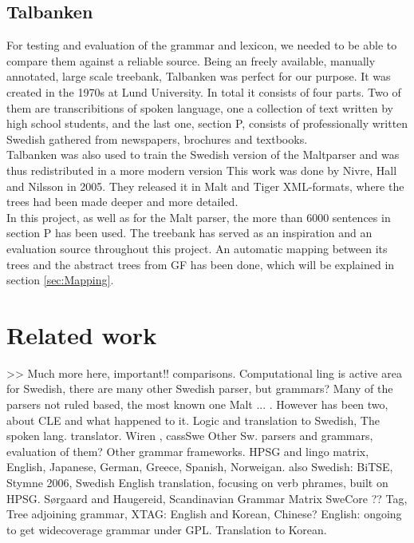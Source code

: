 \documentclass{report}
\begin{document}
\subsection{Talbanken}
For testing and evaluation of the grammar and lexicon, we needed to be able to
compare them against a reliable source.
Being an freely available, manually annotated, large scale treebank,
Talbanken\cite{talbanken} was perfect for our purpose.
It was created in the 1970s at Lund University. In total it consists of four
parts. Two of them are transcribitions of spoken language, one a collection of
text written by high school students, and the last one, section P,
consists of professionally written Swedish gathered from newspapers, brochures and textbooks.\\
Talbanken was also used to train the Swedish version of the Maltparser\cite{malt}
and was thus redistributed in a more modern version\cite{talbanken05} This work
was done by Nivre, Hall and Nilsson in 2005. They released it in Malt and Tiger XML-formats,
where the trees had been made deeper and more detailed. \\
In this project, as well as for the Malt parser, the more than 6000 sentences
in section P has been used.
The treebank has served as an inspiration and an evaluation source throughout this
project. An automatic mapping between its trees and the abstract trees from GF has been
done, which will be explained in section \ref{sec:Mapping}.

\section{Related work}
>> Much more here, important!! comparisons.
Computational ling is active area for Swedish, there are many other Swedish parser,
but grammars?
Many of the parsers not ruled based, the most known one Malt\cite{malt} ... .
However has been two, about CLE\cite{cle} and what happened to it. Logic and translation
to Swedish, The spoken lang. translator\cite{cle2}. Wiren \cite{wiren}, cassSwe \cite{casswe}
Other Sw. parsers and grammars, evaluation of them? 
Other grammar frameworks.
HPSG\cite{hpsg} and lingo matrix\cite{lingomatrix}, English, Japanese, German, Greece, Spanish, Norweigan.
also Swedish: BiTSE\cite{stymne}, Stymne 2006, Swedish English translation, focusing on verb phrames, built on HPSG.
S\o rgaard and Haugereid, Scandinavian Grammar Matrix\cite{scandmatrix}
SweCore ??
Tag, Tree adjoining grammar, XTAG: English and Korean, Chinese? English: ongoing to get widecoverage grammar
under GPL. Translation to Korean.
\end{document}
